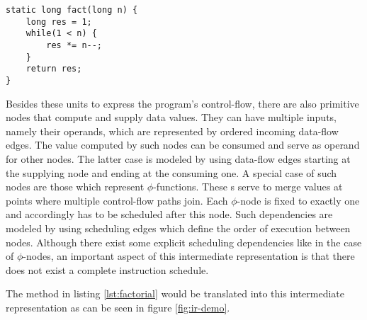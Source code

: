 \begin{lstlisting}[label=lst:factorial, caption=Example adopted from \cite{eisl:2013}]
static long fact(long n) {
	long res = 1;
	while(1 < n) {
		res *= n--;
	}
	return res;
}
\end{lstlisting}

Besides these units to express the program's control-flow, there are also primitive nodes that compute and supply data values. They can have multiple inputs, namely their operands, which are represented by ordered incoming data-flow edges. The value computed by such nodes can be consumed and serve as operand for other nodes. The latter case is modeled by using data-flow edges starting at the supplying node and ending at the consuming one. A special case of such nodes are those which represent $\phi$-functions. These s serve to merge values at points where multiple control-flow paths join. Each $\phi$-node is fixed to exactly one  and accordingly has to be scheduled after this node. Such dependencies are modeled by using scheduling edges which define the order of execution between nodes. Although there exist some explicit scheduling dependencies like in the case of $\phi$-nodes, an important aspect of this intermediate representation is that there does not exist a complete instruction schedule.

The method in listing \ref{lst:factorial} would be translated into this intermediate representation as can be seen in figure \ref{fig:ir-demo}.

